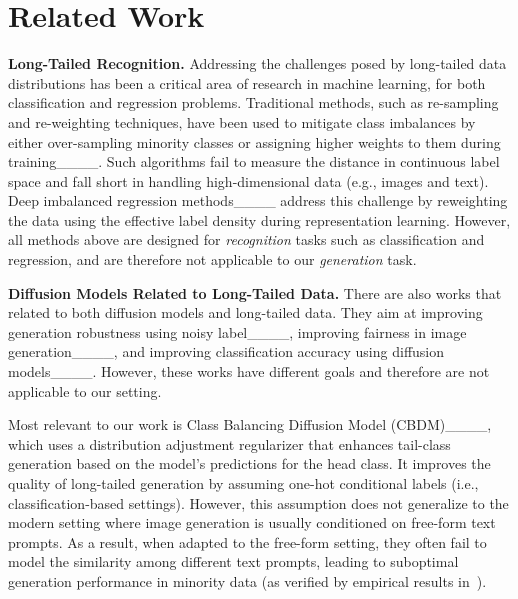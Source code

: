 \section{Related Work}
\textbf{Long-Tailed Recognition.} 
Addressing the challenges posed by long-tailed data distributions has been a critical area of research in machine learning, for both classification and regression problems. Traditional methods, such as re-sampling and re-weighting techniques, have been used to mitigate class imbalances by either over-sampling minority classes or assigning higher weights to them during training____. 
Such algorithms fail to measure the distance in continuous label space and fall short in handling high-dimensional data (e.g., images and text). 
Deep imbalanced regression methods____ address this challenge by reweighting the data using the effective label density during representation learning. 
However, all methods above are designed for \emph{recognition} tasks such as classification and regression, and are therefore not applicable to our \emph{generation} task. 

\textbf{Diffusion Models Related to Long-Tailed Data.} 
There are also works that related to both diffusion models and long-tailed data. They aim at improving generation robustness using noisy label____, improving fairness in image generation____, and improving classification accuracy using diffusion models____. However, these works have different goals and therefore are not applicable to our setting. 

Most relevant to our work is Class Balancing Diffusion Model (CBDM)____, which uses a distribution adjustment regularizer that enhances tail-class generation based on the model’s predictions for the head class. 
It improves the quality of long-tailed generation by assuming one-hot conditional labels (i.e., classification-based settings). 
However, this assumption does not generalize to the modern setting where image generation is usually conditioned on free-form text prompts. As a result, when adapted to the free-form setting, they often fail to model the similarity among different text prompts, leading to suboptimal generation performance in minority data (as verified by empirical results in~).